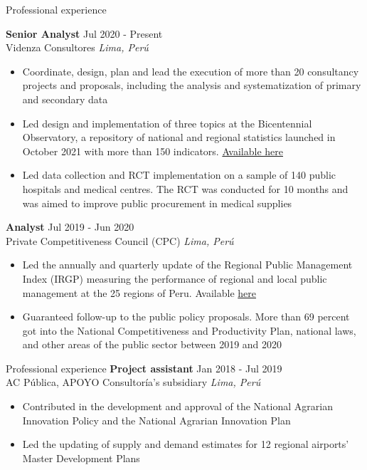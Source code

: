 \documentclass{resume} %
\begin{document}
\begin{rSection}{Professional experience}

\textbf{Senior Analyst} \hfill Jul 2020 - Present \\
Videnza Consultores \hfill \textit{Lima, Perú}
 \begin{itemize}
    \itemsep -3pt {} 
      \item Coordinate, design, plan and lead the execution of more than 20 consultancy projects and proposals, including the analysis and systematization of primary and secondary data
      \item Led design and implementation of three topics at the Bicentennial Observatory, a repository of national and regional statistics launched in October 2021 with more than 150 indicators. \href{https://propuestasdelbicentenario.pe/observatorio/}{Available here}
      \item Led data collection and RCT implementation on a sample of 140 public hospitals and medical centres. The RCT was conducted for 10 months and was aimed to improve public procurement in medical supplies
   \end{itemize}
 
 \textbf{Analyst} \hfill Jul 2019 - Jun 2020\\
Private Competitiveness Council (CPC) \hfill \textit{Lima, Perú}
 \begin{itemize}
    \itemsep -3pt {} 
      \item Led the annually and quarterly update of the Regional Public Management Index (IRGP) measuring the performance of regional and local public management at the 25 regions of Peru. Available \href{https://www.compite.pe/wp-content/uploads/2020/07/IRGP-2020-version-final.pdf}{here}
      \item Guaranteed follow-up to the public policy proposals. More than 69 percent got into the National Competitiveness and Productivity Plan, national laws, and other areas of the public sector between 2019 and 2020
 \end{itemize}
\end{rSection} 

\pagebreak
\begin{rSection}{Professional experience}
   \textbf{Project assistant} \hfill Jan 2018 - Jul 2019\\
AC Pública, APOYO Consultoría's subsidiary \hfill \textit{Lima, Perú}
 \begin{itemize}
    \itemsep -3pt {} 
     \item Contributed in the development and approval of the National Agrarian Innovation Policy and the National Agrarian Innovation Plan
     \item Led the updating of supply and demand estimates for 12 regional airports’ Master Development Plans
 \end{itemize}
\end{rSection} 
\end{document}
